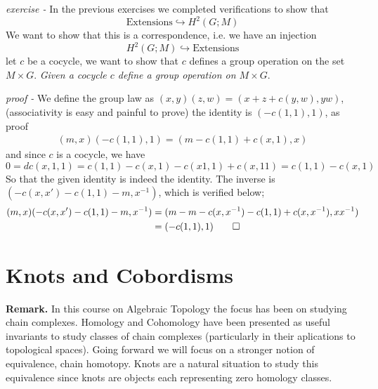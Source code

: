 \documentclass[11pt]{article}
\theoremstyle{definition}
\begin{document}

    \emph{exercise - }\label{CEx13} In the previous exercises we completed verifications to show that \[\text{Extensions} \hookrightarrow H^2(G;M)\]
    We want to show that this is a correspondence, i.e. we have an injection \[H^2(G;M) \hookrightarrow \text{Extensions}\] let \(c\) be a cocycle, we want to show that \(c\) defines a group operation on the set \(M \times G\). \emph{Given a cocycle \(c\) define a group operation on \(M \times G\)}.

    \emph{proof - } We define the group law as \((x,y)(z,w) = (x + z + c(y,w),yw)\), (associativity is easy and painful to prove) the identity is \((-c(1,1),1)\), as proof
    \begin{align*}
        (m,x)(-c(1,1),1) = (m - c(1,1) + c(x,1),x)
    \end{align*}
    and since \(c\) is a cocycle, we have \[0 = dc(x,1,1) = c(1,1) - c(x,1) - c(x1,1) + c(x,11) = c(1,1) - c(x,1)\]
    So that the given identity is indeed the identity. The inverse is \((-c(x,x')-c(1,1)-m,x^{-1})\), which is verified below;
    \begin{align*}
        (m,x)(-c(x,x')-c(1,1)-m,x^{-1}) &= (m - m - c(x,x^{-1}) - c(1,1) + c(x,x^{-1}),xx^{-1}) \\
        &= (-c(1,1),1) \qed
    \end{align*}


    \section{Knots and Cobordisms}

    \textbf{Remark.} In this course on Algebraic Topology the focus has been on studying chain complexes. Homology and Cohomology have been presented as useful invariants to study classes of chain complexes (particularly in their aplications to topological spaces). Going forward we will focus on a stronger notion of equivalence, chain homotopy. Knots are a natural situation to study this equivalence since knots are objects each representing zero homology classes.
\end{document}
